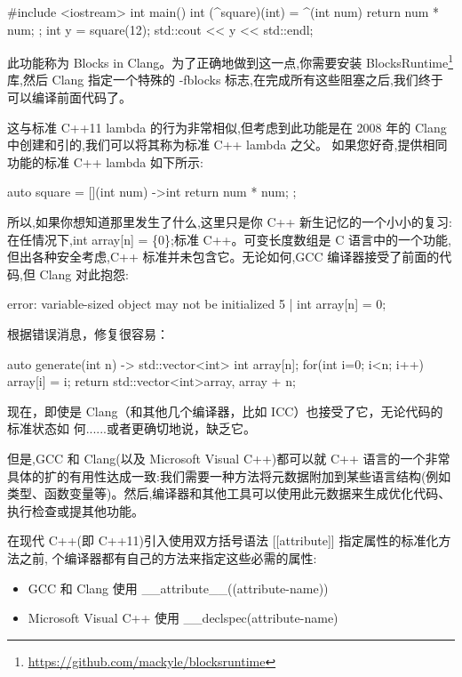 \begin{cpp}
#include <iostream>
int main() {
  int (^square)(int) = ^(int num) { return num * num; };
  int y = square(12);
  std::cout << y << std::endl;
}
\end{cpp}

此功能称为 Blocks in Clang。为了正确地做到这一点,你需要安装 BlocksRuntime\footnote{\url{https://github.com/mackyle/blocksruntime}} 库,然后 Clang 指定一个特殊的 -fblocks 标志,在完成所有这些阻塞之后,我们终于可以编译前面代码了。

这与标准 C++11 lambda 的行为非常相似,但考虑到此功能是在 2008 年的 Clang 中创建和引的,我们可以将其称为标准 C++ lambda 之父。 如果您好奇,提供相同功能的标准 C++ lambda 如下所示:

\begin{cpp}
auto square = [](int num) ->int { return num * num; };
\end{cpp}

所以,如果你想知道那里发生了什么,这里只是你 C++ 新生记忆的一个小小的复习:在任情况下,int array[n] = \{0\};标准 C++。可变长度数组是 C 语言中的一个功能,但出各种安全考虑,C++ 标准并未包含它。无论如何,GCC 编译器接受了前面的代码,但 Clang 对此抱怨:

\begin{shell}
error: variable-sized object may not be initialized
   5 | int array[n] = {0};
\end{shell}

根据错误消息，修复很容易：

\begin{cpp}
auto generate(int n) -> std::vector<int>{
  int array[n];
  for(int i=0; i<n; i++) array[i] = i;
  return std::vector<int>{array, array + n};
}
\end{cpp}

现在，即使是 Clang（和其他几个编译器，比如 ICC）也接受了它，无论代码的标准状态如
何......或者更确切地说，缺乏它。


但是,GCC 和 Clang(以及 Microsoft Visual C++)都可以就 C++ 语言的一个非常具体的扩的有用性达成一致:我们需要一种方法将元数据附加到某些语言结构(例如类型、函数变量等)。然后,编译器和其他工具可以使用此元数据来生成优化代码、执行检查或提其他功能。

在现代 C++(即 C++11)引入使用双方括号语法 [[attribute]] 指定属性的标准化方法之前, 个编译器都有自己的方法来指定这些必需的属性:

\begin{itemize}
\item 
GCC 和 Clang 使用 \_\_attribute\_\_((attribute-name))

\item 
Microsoft Visual C++ 使用 \_\_declspec(attribute-name)
\end{itemize}

